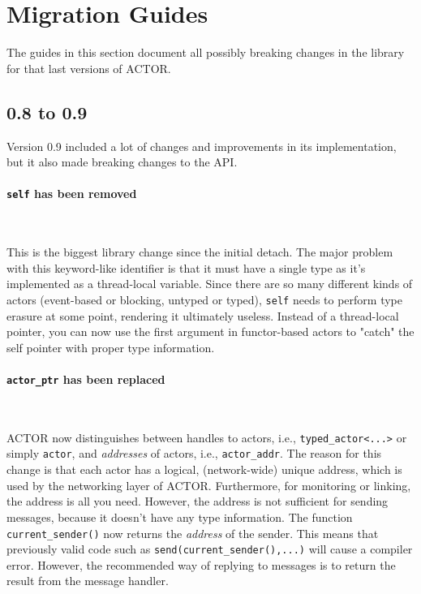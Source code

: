\section{Migration Guides}

The guides in this section document all possibly breaking changes in the
library for that last versions of ACTOR.

\subsection{0.8 to 0.9}

Version 0.9 included a lot of changes and improvements in its implementation,
but it also made breaking changes to the API.

\paragraph{\lstinline^self^ has been removed}

~

This is the biggest library change since the initial detach. The major problem
with this keyword-like identifier is that it must have a single type as it's
implemented as a thread-local variable. Since there are so many different kinds
of actors (event-based or blocking, untyped or typed), \lstinline^self^ needs
to perform type erasure at some point, rendering it ultimately useless. Instead
of a thread-local pointer, you can now use the first argument in functor-based
actors to "catch" the self pointer with proper type information.

\paragraph{\lstinline^actor_ptr^ has been replaced}

~

ACTOR now distinguishes between handles to actors, i.e.,
\lstinline^typed_actor<...>^ or simply \lstinline^actor^, and \emph{addresses}
of actors, i.e., \lstinline^actor_addr^. The reason for this change is that
each actor has a logical, (network-wide) unique address, which is used by the
networking layer of ACTOR. Furthermore, for monitoring or linking, the address
is all you need. However, the address is not sufficient for sending messages,
because it doesn't have any type information. The function
\lstinline^current_sender()^ now returns the \emph{address} of the sender. This
means that previously valid code such as \lstinline^send(current_sender(),...)^
will cause a compiler error. However, the recommended way of replying to
messages is to return the result from the message handler.

